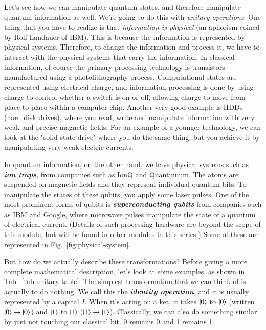Let's see how we can manipulate quantum states, and therefore manipulate quantum information as well. We're going to do this with \emph{unitary operations}. One thing that you have to realize is that \emph{information is physical} (an aphorism coined by Rolf Landauer of IBM). This is because the information is represented by physical systems. Therefore, to change the information and process it, we have to interact with the physical systems that carry the information. In classical information, of course the primary processing technology is transistors manufactured using a photolithography process.  Computational states are represented using electrical charge, and information processing is done by using charge to control whether a switch is on or off, allowing charge to move from place to place within a computer chip.  Another very good example is HDDs (hard disk drives), where you read, write and manipulate information with very weak and precise magnetic fields. For an example of a younger technology, we can look at the "solid-state drive" where you do the same thing, but you achieve it by manipulating very weak electric currents.

In quantum information, on the other hand, we have physical systems such as \textbf{\emph{ion traps}}, from companies such as IonQ and Quantinuum. The atoms are suspended on magnetic fields and they represent individual quantum bits. To manipulate the states of these qubits, you apply some laser pulses.  One of the most prominent forms of qubits is \textbf{\emph{superconducting qubits}} from companies such as IBM and Google, where microwave pulses manipulate the state of a quantum of electrical current. (Details of such processing hardware are beyond the scope of this module, but will be found in other modules in this series.) Some of these are represented in Fig.~\ref{fig:physical-system}.

But how do we actually describe these transformations? Before giving a more complete mathematical description, let's look at some examples, as shown in Tab.~\ref{tab:unitary-table}. The simplest transformation that we can think of is actually to do nothing. We call this the \textbf{\emph{identity operation}}, and it is usually represented by a capital $I$. When it's acting on a ket, it takes $\left| 0 \right\rangle$ to $\left| 0 \right\rangle$  (written $\left| 0 \right\rangle\rightarrow\left| 0 \right\rangle$) and $\left| 1 \right\rangle$ to $\left| 1 \right\rangle$ ($\left| 1 \right\rangle\rightarrow\left| 1 \right\rangle$). Classically, we can also do something similar by just not touching our classical bit. 0 remains 0 and 1 remains 1.

